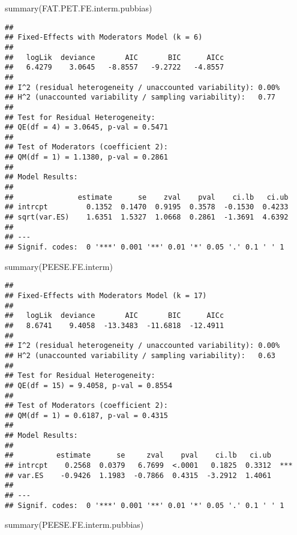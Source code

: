 \documentclass[
]{book}
\newenvironment{Shaded}{\begin{snugshade}}{\end{snugshade}}
\newcommand{\FunctionTok}[1]{\textcolor[rgb]{0.00,0.00,0.00}{#1}}
\newcommand{\NormalTok}[1]{#1}
\theoremstyle{definition}
\theoremstyle{definition}
\theoremstyle{definition}
\theoremstyle{definition}
\theoremstyle{remark}
\begin{document}
\begin{Shaded}
\begin{Highlighting}[]
\FunctionTok{summary}\NormalTok{(FAT.PET.FE.interm.pubbias)}
\end{Highlighting}
\end{Shaded}

\begin{verbatim}
## 
## Fixed-Effects with Moderators Model (k = 6)
## 
##   logLik  deviance       AIC       BIC      AICc 
##   6.4279    3.0645   -8.8557   -9.2722   -4.8557   
## 
## I^2 (residual heterogeneity / unaccounted variability): 0.00%
## H^2 (unaccounted variability / sampling variability):   0.77
## 
## Test for Residual Heterogeneity:
## QE(df = 4) = 3.0645, p-val = 0.5471
## 
## Test of Moderators (coefficient 2):
## QM(df = 1) = 1.1380, p-val = 0.2861
## 
## Model Results:
## 
##               estimate      se    zval    pval    ci.lb   ci.ub 
## intrcpt         0.1352  0.1470  0.9195  0.3578  -0.1530  0.4233    
## sqrt(var.ES)    1.6351  1.5327  1.0668  0.2861  -1.3691  4.6392    
## 
## ---
## Signif. codes:  0 '***' 0.001 '**' 0.01 '*' 0.05 '.' 0.1 ' ' 1
\end{verbatim}

\begin{Shaded}
\begin{Highlighting}[]
\FunctionTok{summary}\NormalTok{(PEESE.FE.interm)}
\end{Highlighting}
\end{Shaded}

\begin{verbatim}
## 
## Fixed-Effects with Moderators Model (k = 17)
## 
##   logLik  deviance       AIC       BIC      AICc 
##   8.6741    9.4058  -13.3483  -11.6818  -12.4911   
## 
## I^2 (residual heterogeneity / unaccounted variability): 0.00%
## H^2 (unaccounted variability / sampling variability):   0.63
## 
## Test for Residual Heterogeneity:
## QE(df = 15) = 9.4058, p-val = 0.8554
## 
## Test of Moderators (coefficient 2):
## QM(df = 1) = 0.6187, p-val = 0.4315
## 
## Model Results:
## 
##          estimate      se     zval    pval    ci.lb   ci.ub 
## intrcpt    0.2568  0.0379   6.7699  <.0001   0.1825  0.3312  *** 
## var.ES    -0.9426  1.1983  -0.7866  0.4315  -3.2912  1.4061      
## 
## ---
## Signif. codes:  0 '***' 0.001 '**' 0.01 '*' 0.05 '.' 0.1 ' ' 1
\end{verbatim}

\begin{Shaded}
\begin{Highlighting}[]
\FunctionTok{summary}\NormalTok{(PEESE.FE.interm.pubbias)}
\end{Highlighting}
\end{Shaded}
\end{document}

